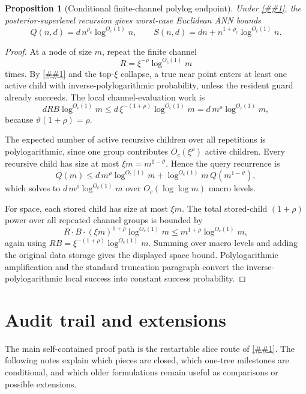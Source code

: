 \documentclass[10pt]{article}
\newcommand{\cref}[1]{\ref{##1}}
\newtheorem{proposition}[theorem]{Proposition}
\theoremstyle{definition}
\begin{document}
\begin{proposition}[Conditional finite-channel polylog endpoint]\label{prop:finite-channel-polylog}
   Under \cref{asm:finite-restricted-channel}, the posterior-superlevel recursion gives worst-case Euclidean ANN bounds
   \[
      Q(n,d)=d\,n^{\rho_c}\log^{O_c(1)}n,
      \qquad
      S(n,d)=dn+n^{1+\rho_c}\log^{O_c(1)}n.
   \]
\end{proposition}

\begin{proof}
   At a node of size $m$, repeat the finite channel
   \[
      R=\xi^{-\rho}\log^{O_c(1)}m
   \]
   times. By \cref{asm:finite-restricted-channel} and the top-$\xi$ collapse, a true near point enters at least one active child with inverse-polylogarithmic probability, unless the resident guard already succeeds. The local channel-evaluation work is
   \[
      dRB\log^{O_c(1)}m
      \le
      d\,\xi^{-(1+\rho)}\log^{O_c(1)}m
      =
      d\,m^\rho\log^{O_c(1)}m,
   \]
   because $\vartheta(1+\rho)=\rho$.

   The expected number of active recursive children over all repetitions is polylogarithmic, since one group contributes $O_c(\xi^\rho)$ active children. Every recursive child has size at most $\xi m=m^{1-\vartheta}$. Hence the query recurrence is
   \[
      Q(m)\le d\,m^\rho\log^{O_c(1)}m+\log^{O_c(1)}m\,Q(m^{1-\vartheta}),
   \]
   which solves to $d\,m^\rho\log^{O_c(1)}m$ over $O_c(\log\log m)$ macro levels.

   For space, each stored child has size at most $\xi m$. The total stored-child $(1+\rho)$ power over all repeated channel groups is bounded by
   \[
      R\cdot B\cdot(\xi m)^{1+\rho}\log^{O_c(1)}m
      \le
      m^{1+\rho}\log^{O_c(1)}m,
   \]
   again using $RB=\xi^{-(1+\rho)}\log^{O_c(1)}m$. Summing over macro levels and adding the original data storage gives the displayed space bound. Polylogarithmic amplification and the standard truncation paragraph convert the inverse-polylogarithmic local success into constant success probability.
\end{proof}

\section{Audit trail and extensions}

The main self-contained proof path is the restartable slice route of \cref{prop:slice-two-thirds}. The following notes explain which pieces are closed, which one-tree milestones are conditional, and which older formulations remain useful as comparisons or possible extensions.
\end{document}
